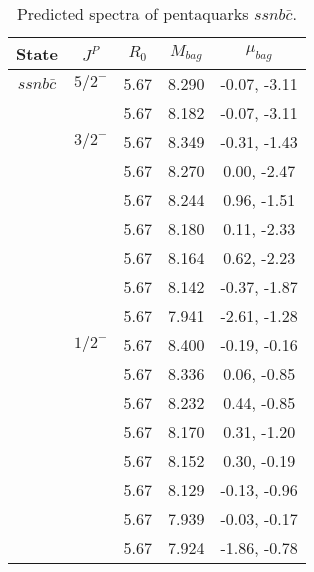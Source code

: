 \documentclass[prd,twocolumn,floatfix,nofootinbib]{revtex4}
\begin{document}
\renewcommand{\tabcolsep}{0.5cm}
\renewcommand{\arraystretch}{1.2}
\begin{table*}[!htbp]
    \caption{Predicted spectra of pentaquarks $ssnb\bar{c}$.}
    \begin{tabular}{ccccc}
        \hline\hline
        {\rm State} &$J^{P}$ &$R_{0}$ &$M_{bag}$ &$\mu_{bag}$ \\ \hline
        $ssnb\bar{c}$
            &${5/2}^{-}$    &5.67  &8.290  &-0.07, -3.11\\
            &               &5.67   &8.182 &-0.07, -3.11  \\
            &${3/2}^{-}$    &5.67   &8.349 &-0.31, -1.43  \\
            &               &5.67   &8.270 &0.00, -2.47  \\
            &               &5.67   &8.244 &0.96, -1.51  \\
            &               &5.67   &8.180 &0.11, -2.33  \\
            &               &5.67   &8.164 &0.62, -2.23  \\
            &               &5.67   &8.142 &-0.37, -1.87  \\
            &               &5.67   &7.941 &-2.61, -1.28  \\
            &${1/2}^{-}$    &5.67   &8.400 &-0.19, -0.16  \\
            &               &5.67   &8.336  &0.06, -0.85 \\
            &               &5.67   &8.232  &0.44, -0.85 \\
            &               &5.67   &8.170  &0.31, -1.20 \\
            &               &5.67   &8.152  &0.30, -0.19 \\
            &               &5.67   &8.129  &-0.13, -0.96 \\
            &               &5.67   &7.939  &-0.03, -0.17 \\
            &               &5.67   &7.924  &-1.86, -0.78 \\
        \hline\hline
    \end{tabular}
\end{table*}
\end{document}
